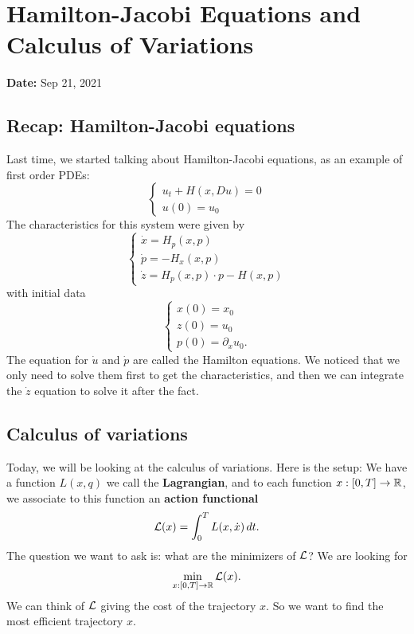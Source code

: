 \newpage
\section{Hamilton-Jacobi Equations and Calculus of Variations}
\textbf{Date:} Sep 21, 2021
\subsection{Recap: Hamilton-Jacobi equations}
Last time, we started talking about Hamilton-Jacobi equations, as an example of first order PDEs: 
\[
\begin{cases}
    u_t + H(x, D u) = 0\\
    u(0) = u_0
\end{cases}
\]
The characteristics for this system were given by 
\[
\begin{cases}
    \dot x = H_p(x,p)\\ 
    \dot p = -H_x(x,p)\\
    \dot z = H_p(x,p) \cdot p - H(x,p)
\end{cases}
\]
with initial data 
\[
\begin{cases}
    x(0) = x_0 \\
    z(0) = u_0\\
    p(0) = \partial_x u_0.
\end{cases}
\]
The equation for $\dot u$ and $\dot p$ are called the Hamilton equations. We noticed that we only need to solve them first to get the characteristics, and then we can integrate the $\dot z$ equation to solve it after the fact.

\subsection{Calculus of variations}
Today, we will be looking at the calculus of variations. Here is the setup: We have a function $L(x,q)$ we call the \textbf{Lagrangian}, and to each function $x:[0,T] \to \mathbb{R}$, we associate to this function an \textbf{action functional}
\[
    \mathcal{L}(x) = \int_0^T L(x,\dot x)\,dt.
\]
The question we want to ask is: what are the minimizers of $\mathcal{L}$? We are looking for 
\[
    \min_{x:[0,T]\to \mathbb{R}} \mathcal{L}(x).
\]
We can think of $\mathcal{L}$ giving the cost of the trajectory $x$. So we want to find the most efficient trajectory $x$.

